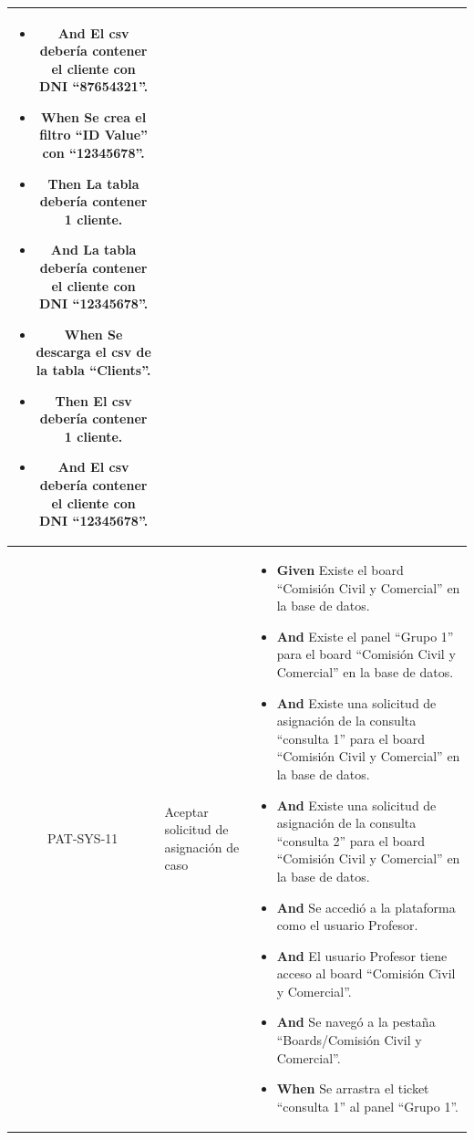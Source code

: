\begin{longtable}{|c|p{2.5cm}|p{10.5cm}|}
\begin{itemize}
        \item \textbf{And} El csv debería contener el cliente con DNI ``87654321''.
        \newline
        \item \textbf{When} Se crea el filtro ``ID Value'' con ``12345678''.
        \newline
        \item \textbf{Then} La tabla debería contener 1 cliente.
        \item \textbf{And} La tabla debería contener el cliente con DNI ``12345678''.
        \newline
        \item \textbf{When} Se descarga el csv de la tabla ``Clients''.
        \newline
       \item \textbf{Then} El csv debería contener 1 cliente.
        \item \textbf{And} El csv debería contener el cliente con DNI ``12345678''.
    \end{itemize}
    \\
    \hline
    PAT-SYS-11 & Aceptar solicitud de asignación de caso &
    \begin{itemize}
        \item \textbf{Given} Existe el board ``Comisión Civil y Comercial'' en la base de datos.
        \item \textbf{And} Existe el panel ``Grupo 1'' para el board ``Comisión Civil y Comercial'' en la base de datos.
        \item \textbf{And} Existe una solicitud de asignación de la consulta ``consulta 1'' para el board ``Comisión Civil y Comercial'' en la base de datos.
        \item \textbf{And} Existe una solicitud de asignación de la consulta ``consulta 2'' para el board ``Comisión Civil y Comercial'' en la base de datos.
        \item \textbf{And} Se accedió a la plataforma como el usuario Profesor.
        \item \textbf{And} El usuario Profesor tiene acceso al board ``Comisión Civil y Comercial''.
        \item \textbf{And} Se navegó a la pestaña ``Boards/Comisión Civil y Comercial''.
        \newline
        \item \textbf{When} Se arrastra el ticket ``consulta 1'' al panel ``Grupo 1''.
        \newline
        

\end{itemize}
\end{longtable}
